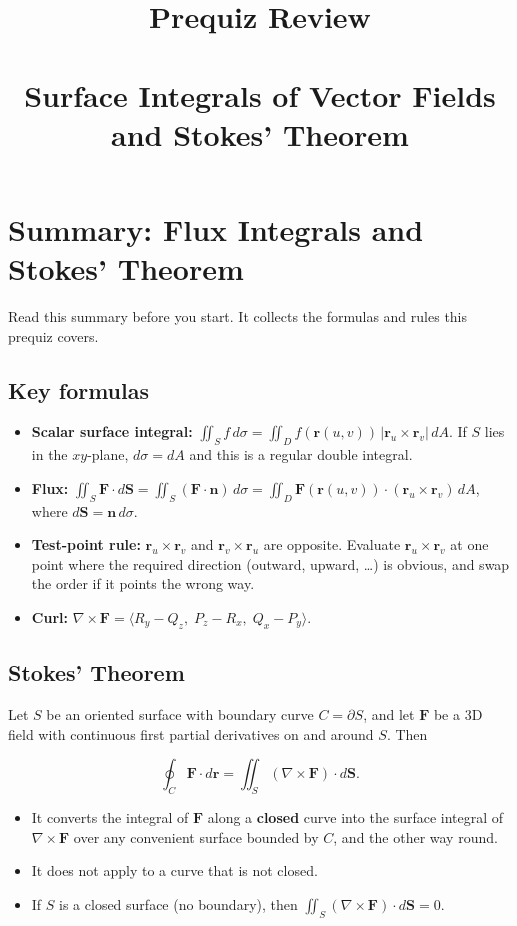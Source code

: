 \documentclass[11pt]{article}
\title{{Prequiz Review} \\ \\
Surface Integrals of Vector Fields and Stokes' Theorem}
\author{}
\date{}
\newcommand{\bF}{\mathbf{F}}
\newcommand{\br}{\mathbf{r}}
\newcommand{\bn}{\mathbf{n}}
\newcommand{\curl}{\nabla\times}
\newcommand{\dA}{\,dA}
\begin{document}
\maketitle

\section*{Summary: Flux Integrals and Stokes' Theorem}

Read this summary before you start. It collects the formulas and rules this prequiz covers.

\subsection*{Key formulas}
\begin{itemize}[nosep]
  \item \textbf{Scalar surface integral:} $\displaystyle\iint_S f\,d\sigma=\iint_D f(\br(u,v))\,\lvert\br_u\times\br_v\rvert\dA$. If $S$ lies in the $xy$-plane, $d\sigma=dA$ and this is a regular double integral.
  \item \textbf{Flux:} $\displaystyle\iint_S\bF\cdot d\mathbf{S}=\iint_S(\bF\cdot\bn)\,d\sigma=\iint_D\bF(\br(u,v))\cdot(\br_u\times\br_v)\dA$, where $d\mathbf{S}=\bn\,d\sigma$.
  \item \textbf{Test-point rule:} $\br_u\times\br_v$ and $\br_v\times\br_u$ are opposite. Evaluate $\br_u\times\br_v$ at one point where the required direction (outward, upward, \dots) is obvious, and swap the order if it points the wrong way.
  \item \textbf{Curl:} $\curl\bF=\langle R_y-Q_z,\;P_z-R_x,\;Q_x-P_y\rangle$.
\end{itemize}

\subsection*{Stokes' Theorem}

Let $S$ be an oriented surface with boundary curve $C=\partial S$, and let $\bF$ be a 3D field with continuous first partial derivatives on and around $S$. Then
\begin{keybox}
\[
  \oint_C\bF\cdot d\br=\iint_S(\curl\bF)\cdot d\mathbf{S}.
\]
\end{keybox}
\begin{itemize}[nosep]
  \item It converts the integral of $\bF$ along a \textbf{closed} curve into the surface integral of $\curl\bF$ over any convenient surface bounded by $C$, and the other way round.
  \item It does not apply to a curve that is not closed.
  \item If $S$ is a closed surface (no boundary), then $\iint_S(\curl\bF)\cdot d\mathbf{S}=0$.
\end{itemize}
\end{document}
